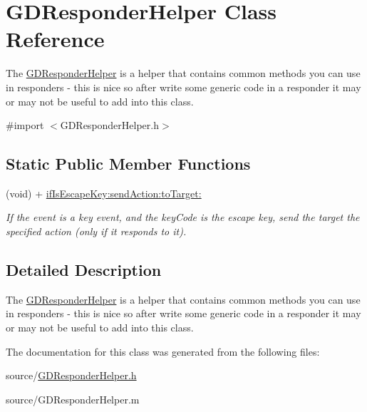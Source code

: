 \hypertarget{interface_g_d_responder_helper}{
\section{GDResponderHelper Class Reference}
\label{interface_g_d_responder_helper}
}


The \hyperlink{interface_g_d_responder_helper}{GDResponderHelper} is a helper that contains common methods you can use in responders -\/ this is nice so after write some generic code in a responder it may or may not be useful to add into this class.  


{\ttfamily \#import $<$GDResponderHelper.h$>$}\subsection*{Static Public Member Functions}
\begin{DoxyCompactItemize}
\item 
\hypertarget{interface_g_d_responder_helper_ad6b0a7142bfbb8ca88232e3422b2a5d7}{
(void) + \hyperlink{interface_g_d_responder_helper_ad6b0a7142bfbb8ca88232e3422b2a5d7}{ifIsEscapeKey:sendAction:toTarget:}}
\label{interface_g_d_responder_helper_ad6b0a7142bfbb8ca88232e3422b2a5d7}

\begin{DoxyCompactList}\small\item\em If the event is a key event, and the keyCode is the escape key, send the target the specified action (only if it responds to it). \item\end{DoxyCompactList}\end{DoxyCompactItemize}


\subsection{Detailed Description}
The \hyperlink{interface_g_d_responder_helper}{GDResponderHelper} is a helper that contains common methods you can use in responders -\/ this is nice so after write some generic code in a responder it may or may not be useful to add into this class. 

The documentation for this class was generated from the following files:\begin{DoxyCompactItemize}
\item 
source/\hyperlink{_g_d_responder_helper_8h}{GDResponderHelper.h}\item 
source/GDResponderHelper.m\end{DoxyCompactItemize}
